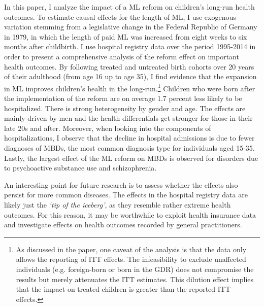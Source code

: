 In this paper, I analyze the impact of a ML reform on children's long-run health outcomes. To estimate causal effects for the length of ML, I use exogenous variation stemming from a legislative change in the Federal Republic of Germany in 1979, in which the length of paid ML was increased from eight weeks to six months after childbirth. I use hospital registry data over the period 1995-2014 in order to present a comprehensive analysis of the reform effect on important health outcomes. By following treated and untreated birth cohorts over 20 years of their adulthood (from age 16 up to age 35), I find evidence that the expansion in ML improves children's health in the long-run.\footnote{As discussed in the paper, one caveat of the analysis is that the data only allows the reporting of ITT effects. The infeasibility to exclude unaffected individuals (e.g. foreign-born or born in the GDR) does not compromise the results but merely attenuates the ITT estimates. This dilution effect implies that the impact on treated children is greater than the reported ITT effects.} Children who were born after the implementation of the reform are on average 1.7 percent less likely to be hospitalized. There is strong heterogeneity by gender and age. The effects are mainly driven by men and the health differentials get stronger for those in their late 20s and after. Moreover, when looking into the components of hospitalizations, I observe that the decline in hospital admissions is due to fewer diagnoses of MBDs, the most common diagnosis type for individuals aged 15-35. Lastly, the largest effect of the ML reform on MBDs is observed for disorders due to psychoactive substance use and schizophrenia.


An interesting point for future research is to assess whether the effects also persist for more common diseases. The effects in the hospital registry data are likely just the \textit{`tip of the iceberg'}, as they resemble rather extreme health outcomes. For this reason, it may be worthwhile to exploit health insurance data and investigate effects on health outcomes recorded by general practitioners.



